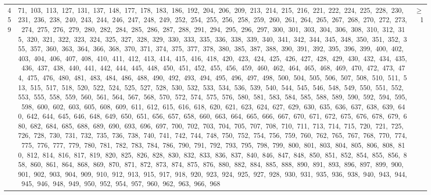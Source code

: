 \begin{longtable}{c|p{}|r}
459 & 71,\ 103,\ 113,\ 127,\ 131,\ 137,\ 148,\ 177,\ 178,\ 183,\ 186,\ 192,\ 204,\ 206,\ 209,\ 213,\ 214,\ 215,\ 216,\ 221,\ 222,\ 224,\ 225,\ 228,\ 230,\ 231,\ 236,\ 238,\ 240,\ 243,\ 244,\ 246,\ 247,\ 248,\ 249,\ 252,\ 254,\ 255,\ 256,\ 258,\ 259,\ 260,\ 261,\ 264,\ 265,\ 267,\ 268,\ 270,\ 272,\ 273,\ 274,\ 275,\ 276,\ 279,\ 280,\ 282,\ 284,\ 285,\ 286,\ 287,\ 288,\ 291,\ 294,\ 295,\ 296,\ 297,\ 300,\ 301,\ 303,\ 304,\ 306,\ 308,\ 310,\ 312,\ 315,\ 320,\ 321,\ 322,\ 323,\ 324,\ 325,\ 327,\ 328,\ 329,\ 330,\ 333,\ 335,\ 336,\ 338,\ 339,\ 340,\ 341,\ 342,\ 344,\ 345,\ 348,\ 350,\ 351,\ 352,\ 355,\ 357,\ 360,\ 363,\ 364,\ 366,\ 368,\ 370,\ 371,\ 374,\ 375,\ 377,\ 378,\ 380,\ 385,\ 387,\ 388,\ 390,\ 391,\ 392,\ 395,\ 396,\ 399,\ 400,\ 402,\ 403,\ 404,\ 406,\ 407,\ 408,\ 410,\ 411,\ 412,\ 413,\ 414,\ 415,\ 416,\ 418,\ 420,\ 423,\ 424,\ 425,\ 426,\ 427,\ 428,\ 429,\ 430,\ 432,\ 434,\ 435,\ 436,\ 437,\ 438,\ 440,\ 441,\ 442,\ 444,\ 445,\ 448,\ 450,\ 451,\ 452,\ 455,\ 456,\ 459,\ 460,\ 462,\ 464,\ 465,\ 468,\ 469,\ 470,\ 472,\ 473,\ 474,\ 475,\ 476,\ 480,\ 481,\ 483,\ 484,\ 486,\ 488,\ 490,\ 492,\ 493,\ 494,\ 495,\ 496,\ 497,\ 498,\ 500,\ 504,\ 505,\ 506,\ 507,\ 508,\ 510,\ 511,\ 513,\ 515,\ 517,\ 518,\ 520,\ 522,\ 524,\ 525,\ 527,\ 528,\ 530,\ 532,\ 533,\ 534,\ 536,\ 539,\ 540,\ 544,\ 545,\ 546,\ 548,\ 549,\ 550,\ 551,\ 552,\ 553,\ 555,\ 558,\ 559,\ 560,\ 561,\ 564,\ 567,\ 568,\ 570,\ 572,\ 574,\ 575,\ 576,\ 580,\ 581,\ 583,\ 584,\ 585,\ 588,\ 589,\ 590,\ 592,\ 594,\ 595,\ 598,\ 600,\ 602,\ 603,\ 605,\ 608,\ 609,\ 611,\ 612,\ 615,\ 616,\ 618,\ 620,\ 621,\ 623,\ 624,\ 627,\ 629,\ 630,\ 635,\ 636,\ 637,\ 638,\ 639,\ 640,\ 642,\ 644,\ 645,\ 646,\ 648,\ 649,\ 650,\ 651,\ 656,\ 657,\ 658,\ 660,\ 663,\ 664,\ 665,\ 666,\ 667,\ 670,\ 671,\ 672,\ 675,\ 676,\ 678,\ 679,\ 680,\ 682,\ 684,\ 685,\ 688,\ 689,\ 690,\ 693,\ 696,\ 697,\ 700,\ 702,\ 703,\ 704,\ 705,\ 707,\ 708,\ 710,\ 711,\ 713,\ 714,\ 715,\ 720,\ 721,\ 725,\ 726,\ 728,\ 730,\ 731,\ 732,\ 735,\ 736,\ 738,\ 740,\ 741,\ 742,\ 744,\ 748,\ 750,\ 752,\ 754,\ 756,\ 759,\ 760,\ 762,\ 765,\ 767,\ 768,\ 770,\ 774,\ 775,\ 776,\ 777,\ 779,\ 780,\ 781,\ 782,\ 783,\ 784,\ 786,\ 790,\ 791,\ 792,\ 793,\ 795,\ 798,\ 799,\ 800,\ 801,\ 803,\ 804,\ 805,\ 806,\ 808,\ 810,\ 812,\ 814,\ 816,\ 817,\ 819,\ 820,\ 825,\ 826,\ 828,\ 830,\ 832,\ 833,\ 836,\ 837,\ 840,\ 846,\ 847,\ 848,\ 850,\ 851,\ 852,\ 854,\ 855,\ 856,\ 858,\ 860,\ 861,\ 864,\ 868,\ 869,\ 870,\ 871,\ 872,\ 873,\ 874,\ 875,\ 876,\ 880,\ 882,\ 884,\ 885,\ 888,\ 890,\ 891,\ 893,\ 896,\ 897,\ 899,\ 900,\ 901,\ 902,\ 903,\ 904,\ 909,\ 910,\ 912,\ 913,\ 915,\ 917,\ 918,\ 920,\ 923,\ 924,\ 925,\ 927,\ 928,\ 930,\ 931,\ 935,\ 936,\ 938,\ 940,\ 943,\ 944,\ 945,\ 946,\ 948,\ 949,\ 950,\ 952,\ 954,\ 957,\ 960,\ 962,\ 963,\ 966,\ 968 & $\ge$ 1 \\

\end{longtable}
